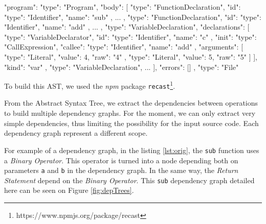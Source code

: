 \begin{code}[Javascript, caption={parts of an AST},label={lst:ast}]
{
  "program": {
    "type": "Program",
    "body": [
      {
        "type": "FunctionDeclaration",
        "id": {
          "type": "Identifier",
          "name": "sub"
        },
        ...
      },
      {
        "type": "FunctionDeclaration",
        "id": {
          "type": "Identifier",
          "name": "add"
        },
        ...
      },
      {
        "type": "VariableDeclaration",
        "declarations": [
          {
            "type": "VariableDeclarator",
            "id": {
              "type": "Identifier",
              "name": "c"
            },
            "init": {
              "type": "CallExpression",
              "callee": {
                "type": "Identifier",
                "name": "add"
              },
              "arguments": [
                {
                  "type": "Literal",
                  "value": 4,
                  "raw": "4"
                },
                {
                  "type": "Literal",
                  "value": 5,
                  "raw": "5"
                }
              ]
            }
          }
        ],
        "kind": "var"
      },
      {
        "type": "VariableDeclaration",
       	...
      }
    ],
    "errors": []
  },
  "type": "File"
}
\end{code}

To build this AST, we used the \textit{npm} package \texttt{recast}\footnote{https://www.npmjs.org/package/recast}.


From the Abstract Syntax Tree, we extract the dependencies between operations to build multiple dependency graphs.
For the moment, we can only extract very simple dependencies, thus limiting the possibility for the input source code.
Each dependency graph represent a different scope.

For example of a dependency graph, in the listing \ref{lst:orig}, the \texttt{sub} function uses a \textit{Binary Operator}.
This operator is turned into a node depending both on parameters \texttt{a} and \texttt{b} in the dependency graph.
In the same way, the \textit{Return Statement} depend on the \textit{Binary Operator}.
This \texttt{sub} dependency graph detailed here can be seen on Figure \ref{fig:depTrees}.

